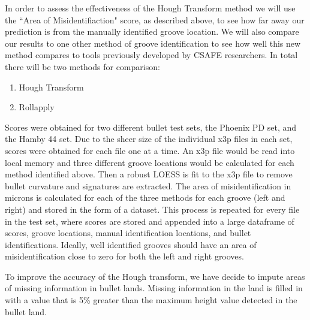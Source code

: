 \documentclass[12pt]{article}\usepackage[]{graphicx}\usepackage[]{color}
\makeatletter
\newenvironment{kframe}{%
 \def\at@end@of@kframe{}%
 \ifinner\ifhmode%
  \def\at@end@of@kframe{\end{minipage}}%
  \begin{minipage}{\columnwidth}%
 \fi\fi%
 \def\FrameCommand##1{\hskip\@totalleftmargin \hskip-\fboxsep
 \colorbox{shadecolor}{##1}\hskip-\fboxsep
     \hskip-\linewidth \hskip-\@totalleftmargin \hskip\columnwidth}%
 \MakeFramed {\advance\hsize-\width
   \@totalleftmargin\z@ \linewidth\hsize
   \@setminipage}}%
 {\par\unskip\endMakeFramed%
 \at@end@of@kframe}
\newenvironment{knitrout}{}{} %
\theoremstyle{nonumberplain}
\makeatother
\begin{document}
In order to assess the effectiveness of the Hough Transform method we will use the ``Area of Misidentifiaction" score, as described above, to see how far away our prediction is from the manually identified groove location. We will also compare our results to one other method of groove identification to see how well this new method compares to tools previously developed by CSAFE researchers. In total there will be two methods for comparison:

\begin{enumerate}
\item Hough Transform
\item Rollapply
\end{enumerate}

Scores were obtained for two different bullet test sets, the Phoenix PD set, and the Hamby 44 set. Due to the sheer size of the individual x3p files in each set, scores were obtained for each file one at a time. An x3p file would be read into local memory and three different groove locations would be calculated for each method identified above. Then a robust LOESS is fit to the x3p file to remove bullet curvature and signatures are extracted. The area of misidentification in microns is calculated for each of the three methods for each groove (left and right) and stored in the form of a dataset. This process is repeated for every file in the test set, where scores are stored and appended into a large dataframe of scores, groove locations, manual identification locations, and bullet identifications. Ideally, well identified grooves should have an area of misidentification close to zero for both the left and right grooves. 

To improve the accuracy of the Hough transform, we have decide to impute areas of missing information in bullet lands. Missing information in the land is filled in with a value that is 5\% greater than the maximum height value detected in the bullet land.



\begin{knitrout}
\color{fgcolor}\begin{kframe}


{\ttfamily\noindent\bfseries{}}\end{kframe}
\end{knitrout}
 
\end{document}
